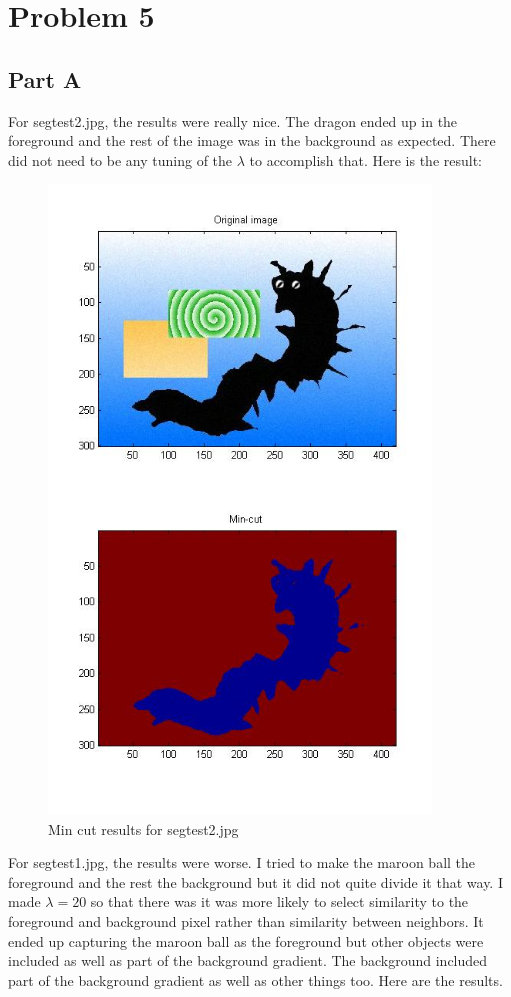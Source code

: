 \documentclass[11pt,psfig]{article}
\begin{document}
\newpage

\section*{Problem 5}

\subsection*{Part A}

For segtest2.jpg, the results were really nice. The dragon ended up in the foreground and the rest of the image was in the background as expected. There did not need to be any tuning of the $\lambda$ to accomplish that. Here is the result:

\begin{figure}[H]
\centering
\includegraphics[width=4in]{prob5plotA.jpg}
\caption{Min cut results for segtest2.jpg}
\end{figure}

For segtest1.jpg, the results were worse. I tried to make the maroon ball the foreground and the rest the background but it did not quite divide it that way. I made $\lambda=20$ so that there was it was more likely to select similarity to the foreground and background pixel rather than similarity between neighbors. It ended up capturing the maroon ball as the foreground but other objects were included as well as part of the background gradient. The background included part of the background gradient as well as other things too. Here are the results.
\end{document}
